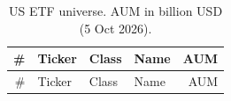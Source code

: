 \documentclass[11pt,a4paper]{article}
\begin{document}
\begin{longtable}{@{}rllp{8.4cm}r@{}}
\caption{US ETF universe. AUM in billion USD (5 Oct 2026).}\\
\toprule
\# & Ticker & Class & Name & AUM\\
\midrule\endfirsthead
\toprule
\# & Ticker & Class & Name & AUM\\
\midrule\endhead
\bottomrule
\end{longtable}
\end{document}
